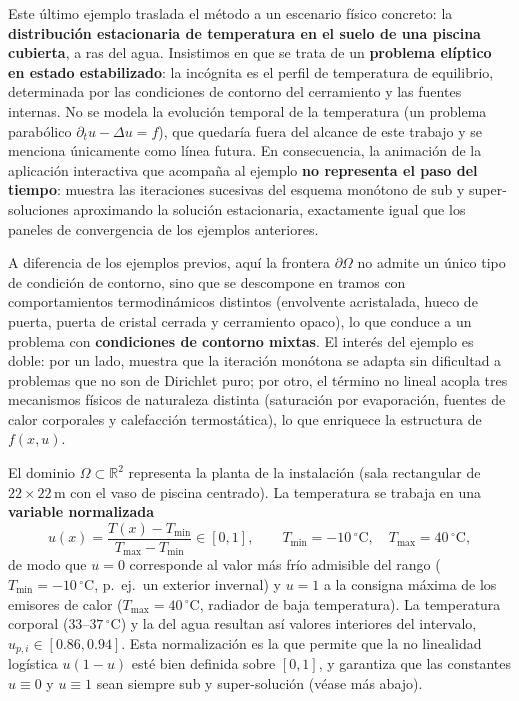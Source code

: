 Este último ejemplo traslada el método a un escenario físico concreto: la
\textbf{distribución estacionaria de temperatura en el suelo de una piscina
cubierta}, a ras del agua. Insistimos en que se trata de un \textbf{problema
elíptico en estado estabilizado}: la incógnita es el perfil de temperatura de
equilibrio, determinada por las condiciones de contorno del cerramiento y las
fuentes internas. No se modela la evolución temporal de la temperatura (un
problema parabólico $\partial_t u - \Delta u = f$), que quedaría fuera del
alcance de este trabajo y se menciona únicamente como línea futura. En
consecuencia, la animación de la aplicación interactiva que acompaña al ejemplo
\textbf{no representa el paso del tiempo}: muestra las iteraciones sucesivas
del esquema monótono de sub y super-soluciones aproximando la solución
estacionaria, exactamente igual que los paneles de convergencia de los
ejemplos anteriores.

A diferencia de los ejemplos previos, aquí la frontera $\partial\Omega$ no
admite un único tipo de condición de contorno, sino que se descompone en tramos
con comportamientos termodinámicos distintos (envolvente acristalada, hueco de
puerta, puerta de cristal cerrada y cerramiento opaco), lo que conduce a un
problema con \textbf{condiciones de contorno mixtas}. El interés del ejemplo es
doble: por un lado, muestra que la iteración monótona se adapta sin dificultad
a problemas que no son de Dirichlet puro; por otro, el término no lineal acopla
tres mecanismos físicos de naturaleza distinta (saturación por evaporación,
fuentes de calor corporales y calefacción termostática), lo que enriquece la
estructura de $f(x,u)$.

El dominio $\Omega \subset \mathbb{R}^2$ representa la planta de la instalación
(sala rectangular de $22 \times 22$\,m con el vaso de piscina centrado). La
temperatura se trabaja en una \textbf{variable normalizada}
\begin{equation}\label{eq:piscina_normalizacion}
  u(x) = \frac{T(x) - T_{\min}}{T_{\max} - T_{\min}} \in [0,1],
  \qquad
  T_{\min} = -10\,^{\circ}\mathrm{C}, \quad T_{\max} = 40\,^{\circ}\mathrm{C},
\end{equation}
de modo que $u = 0$ corresponde al valor más frío admisible del rango
($T_{\min} = -10\,^{\circ}\mathrm{C}$, p.~ej.\ un exterior invernal) y $u = 1$ a la
consigna máxima de los emisores de calor ($T_{\max} = 40\,^{\circ}\mathrm{C}$,
radiador de baja temperatura). La temperatura corporal ($33$--$37\,^{\circ}$C)
y la del agua resultan así valores interiores del intervalo, $u_{p,i} \in
[0.86, 0.94]$. Esta normalización es la que permite que la no linealidad
logística $u(1-u)$ esté bien definida sobre $[0,1]$, y garantiza que las
constantes $u \equiv 0$ y $u \equiv 1$ sean siempre sub y super-solución
(véase más abajo).

